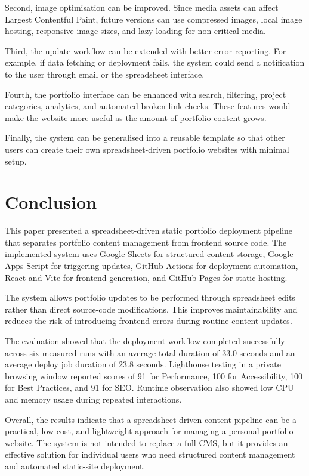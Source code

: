 \documentclass[10pt,a4paper,twocolumn]{article}
\begin{document}
Second, image optimisation can be improved. Since media assets can affect Largest Contentful Paint, future versions can use compressed images, local image hosting, responsive image sizes, and lazy loading for non-critical media.

Third, the update workflow can be extended with better error reporting. For example, if data fetching or deployment fails, the system could send a notification to the user through email or the spreadsheet interface.

Fourth, the portfolio interface can be enhanced with search, filtering, project categories, analytics, and automated broken-link checks. These features would make the website more useful as the amount of portfolio content grows.

Finally, the system can be generalised into a reusable template so that other users can create their own spreadsheet-driven portfolio websites with minimal setup.

\section{Conclusion}

This paper presented a spreadsheet-driven static portfolio deployment pipeline that separates portfolio content management from frontend source code. The implemented system uses Google Sheets for structured content storage, Google Apps Script for triggering updates, GitHub Actions for deployment automation, React and Vite for frontend generation, and GitHub Pages for static hosting.

The system allows portfolio updates to be performed through spreadsheet edits rather than direct source-code modifications. This improves maintainability and reduces the risk of introducing frontend errors during routine content updates.

The evaluation showed that the deployment workflow completed successfully across six measured runs with an average total duration of 33.0 seconds and an average deploy job duration of 23.8 seconds. Lighthouse testing in a private browsing window reported scores of 91 for Performance, 100 for Accessibility, 100 for Best Practices, and 91 for SEO. Runtime observation also showed low CPU and memory usage during repeated interactions.

Overall, the results indicate that a spreadsheet-driven content pipeline can be a practical, low-cost, and lightweight approach for managing a personal portfolio website. The system is not intended to replace a full CMS, but it provides an effective solution for individual users who need structured content management and automated static-site deployment.
\end{document}

